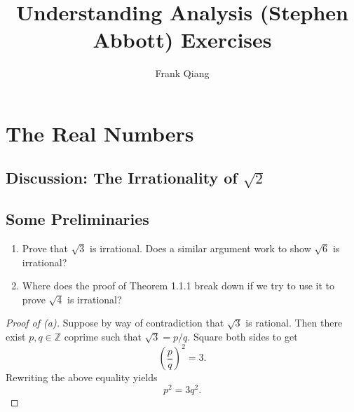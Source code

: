 \documentclass[12pt, letterpaper]{article}
\title{Understanding Analysis (Stephen Abbott) Exercises}
\author{Frank Qiang}
\newcommand{\Z}{\mathbb{Z}}
\begin{document}
\maketitle

\section{The Real Numbers}
\subsection{Discussion: The Irrationality of $\sqrt{2}$}
\subsection{Some Preliminaries}
\begin{tcolorbox}[title=Exercise 1.2.1.]
  \begin{enumerate}[label=(\alph*)]
    \item Prove that $\sqrt{3}$ is irrational. Does a
      similar argument work to show $\sqrt{6}$ is
      irrational?
    \item Where does the proof of Theorem 1.1.1 break
      down if we try to use it to prove $\sqrt{4}$ is
      irrational?
  \end{enumerate}
\end{tcolorbox}
\begin{proof}[Proof of (a)]
  Suppose by way of contradiction that $\sqrt{3}$ is
  rational. Then there exist $p, q \in \Z$ coprime such
  that $\sqrt{3} = p/q$. Square both sides to get
  \[{\left(\frac{p}{q}\right)}^2 = 3.\]
  Rewriting the above equality yields
  \[p^2 = 3q^2.\]
\end{proof}
\end{document}
